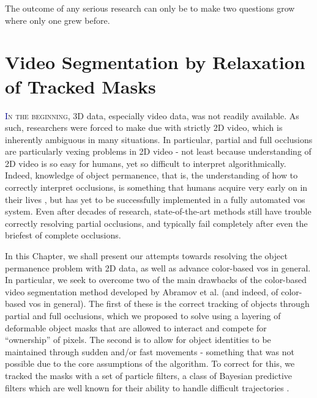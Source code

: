 \begin{savequote}[75mm]
The outcome of any serious research can only be to make two questions grow where only one grew before.
\end{savequote}


\chapter{Video Segmentation by Relaxation of Tracked Masks}
\label{Chap:VideoSegRelaxation}
\lettrine[lines=3, loversize=0.3]{\textcolor{DarkBlue}I}{n the beginning}, 3D data, especially video data, was not readily available. As such, researchers were forced to make due with strictly 2D video, which is inherently ambiguous in many situations. In particular, partial and full occlusions are particularly vexing problems in 2D video - not least because understanding of 2D video is so easy for humans, yet so difficult to interpret algorithmically. Indeed, knowledge of object permanence, that is, the understanding of how to correctly interpret occlusions, is something that humans acquire very early on in their lives \cite{ObjectPermanence}, but has yet to be successfully implemented in a fully automated \gls{vos} system. Even after decades of research, state-of-the-art methods still have trouble correctly resolving partial occlusions, and typically fail completely after even the briefest of complete occlusions.

In this Chapter, we shall present our attempts towards resolving the object permanence problem with 2D data, as well as advance color-based \gls{vos} in general. In particular, we seek to overcome two of the main drawbacks of the color-based video segmentation method developed by Abramov et al. \cite{Abramov_RealtimeSegmentation} (and indeed, of color-based \gls{vos} in general). The first of these is the correct tracking of objects through partial and full occlusions, which we proposed to solve using a layering of deformable object masks that are allowed to interact and compete for ``ownership'' of pixels. The second is to allow for object identities to be maintained through sudden and/or fast movements - something that was not possible due to the core assumptions of the algorithm. To correct for this, we tracked the masks with a set of particle filters, a class of Bayesian predictive filters which are well known for their ability to handle difficult trajectories \cite{TrackingMultipleParticleFiltering,MonteCarloMTT,SequentialMonteCarloMultitargetFiltering}.

